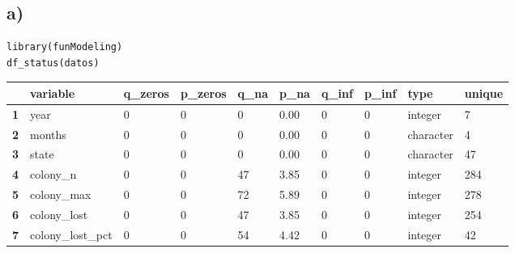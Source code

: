 \documentclass[b4paper]{article}
\begin{document}
    \subsection{a)}
    \begin{tcolorbox}
        \begin{verbatim}
library(funModeling)
df_status(datos)\end{verbatim}
    \end{tcolorbox}
    \begin{table}[h]
        \centering
\begin{tabular}{l|l|l|l|l|l|l|l|l|l|}
\cline{2-10}
                                  & \textbf{variable} & \textbf{q\_zeros} & \textbf{p\_zeros} & \textbf{q\_na} & \textbf{p\_na} & \textbf{q\_inf} & \textbf{p\_inf} & \textbf{type} & \textbf{unique} \\ \hline
\multicolumn{1}{|l|}{\textbf{1}}  & year              & 0                 & 0                 & 0              & 0.00           & 0               & 0               & integer       & 7               \\ \hline
\multicolumn{1}{|l|}{\textbf{2}}  & months            & 0                 & 0                 & 0              & 0.00           & 0               & 0               & character     & 4               \\ \hline
\multicolumn{1}{|l|}{\textbf{3}}  & state             & 0                 & 0                 & 0              & 0.00           & 0               & 0               & character     & 47              \\ \hline
\multicolumn{1}{|l|}{\textbf{4}}  & colony\_n         & 0                 & 0                 & 47             & 3.85           & 0               & 0               & integer       & 284             \\ \hline
\multicolumn{1}{|l|}{\textbf{5}}  & colony\_max       & 0                 & 0                 & 72             & 5.89           & 0               & 0               & integer       & 278             \\ \hline
\multicolumn{1}{|l|}{\textbf{6}}  & colony\_lost      & 0                 & 0                 & 47             & 3.85           & 0               & 0               & integer       & 254             \\ \hline
\multicolumn{1}{|l|}{\textbf{7}}  & colony\_lost\_pct & 0                 & 0                 & 54             & 4.42           & 0               & 0               & integer       & 42              \\ \hline

\end{tabular}
\end{table}
\end{document}
